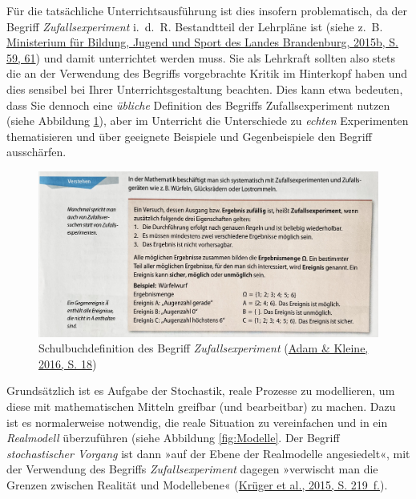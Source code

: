 \documentclass[
  ngerman,
]{scrbook}
\theoremstyle{definition}
\theoremstyle{definition}
\theoremstyle{definition}
\theoremstyle{definition}
\theoremstyle{remark}
\begin{document}
Für die tatsächliche Unterrichtsausführung ist dies insofern problematisch, da der Begriff \emph{Zufallsexperiment} i.~d.~R. Bestandtteil der Lehrpläne ist (siehe z.~B. \protect\hyperlink{ref-MinisteriumfurBildungJugendundSportdesLandesBrandenburg2015a}{Ministerium für Bildung, Jugend und Sport des Landes Brandenburg, 2015b, S. 59, 61}) und damit unterrichtet werden muss. Sie als Lehrkraft sollten also stets die an der Verwendung des Begriffs vorgebrachte Kritik im Hinterkopf haben und dies sensibel bei Ihrer Unterrichtsgestaltung beachten. Dies kann etwa bedeuten, dass Sie dennoch eine \emph{übliche} Definition des Begriffs Zufallsexperiment nutzen (siehe Abbildung \ref{fig:DefinitionZufallsexperiment}), aber im Unterricht die Unterschiede zu \emph{echten} Experimenten thematisieren und über geeignete Beispiele und Gegenbeispiele den Begriff ausschärfen.



\begin{figure}

{\centering \includegraphics[width=0.75\linewidth]{pictures/E-DefinitionZufallsexperiment} 

}

\caption{Schulbuchdefinition des Begriff \emph{Zufallsexperiment} (\protect\hyperlink{ref-Adam2016}{Adam \& Kleine, 2016, S. 18})}\label{fig:DefinitionZufallsexperiment}
\end{figure}

Grundsätzlich ist es Aufgabe der Stochastik, reale Prozesse zu modellieren, um diese mit mathematischen Mitteln greifbar (und bearbeitbar) zu machen. Dazu ist es normalerweise notwendig, die reale Situation zu vereinfachen und in ein \emph{Realmodell} überzuführen (siehe Abbildung \ref{fig:Modelle}. Der Begriff \emph{stochastischer Vorgang} ist dann »auf der Ebene der Realmodelle angesiedelt«, mit der Verwendung des Begriffs \emph{Zufallsexperiment} dagegen »verwischt man die Grenzen zwischen Realität und Modellebene« (\protect\hyperlink{ref-Kruger2015}{Krüger et al., 2015, S. 219~f.}).
\end{document}
